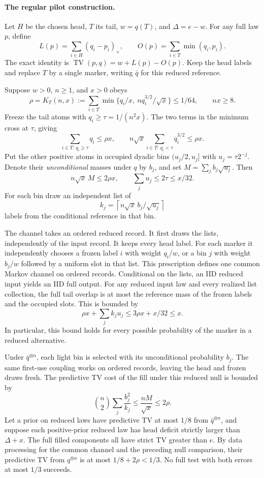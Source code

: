 \paragraph{The regular pilot construction.}
Let \(H\) be the chosen head, \(T\) its tail, \(w=q(T)\), and
\(\Delta=e-w\). For any full law \(p\), define
\[
 L(p)=\sum_{i\in H}(q_i-p_i)_+,\qquad
 O(p)=\sum_{i\in T}\min(q_i,p_i).
\]
The exact identity is \(\operatorname{TV}(p,q)=w+L(p)-O(p)\).
Keep the head labels and replace \(T\) by a single marker, writing
\(\bar q\) for this reduced reference.

Suppose \(w>0\), \(n\geq1\), and \(x>0\) obeys
\[
 \rho=K_T(n,x)
  :=\sum_{i\in T}\min\{q_i/x,\ n q_i^{3/2}/\sqrt{x}\}
  \leq 1/64,\qquad nx\geq 8.
\]
Freeze the tail atoms with \(q_i\geq \tau=1/(n^2x)\).
The two terms in the minimum cross at \(\tau\), giving
\[
 \sum_{i\in T:\,q_i\geq\tau}q_i\leq \rho x,\qquad
 n\sqrt{x}\sum_{i\in T:\,q_i<\tau}q_i^{3/2}\leq \rho x.
\]
Put the other positive atoms in occupied dyadic bins
\((u_j/2,u_j]\) with \(u_j=\tau 2^{-j}\). Denote their
\emph{unconditional} masses under \(q\) by \(b_j\), and set
\(M=\sum_j b_j\sqrt{u_j}\). Then
\[
 n\sqrt{x}\,M\leq 2\rho x,\qquad
 \sum_j u_j\leq 2\tau\leq x/32.
\]
For each bin draw an independent list of
\[
 k_j=\left\lceil n\sqrt{x}\,b_j/\sqrt{u_j}\right\rceil
\]
labels from the conditional reference in that bin.

The channel takes an ordered reduced record. It first draws the lists,
independently of the input record. It keeps every head label. For
each marker it independently chooses a frozen label \(i\) with
weight \(q_i/w\), or a bin \(j\) with weight \(b_j/w\) followed by
a uniform slot in that list. This prescription defines one common
Markov channel on ordered records. Conditional on the lists, an
IID reduced input yields an IID full output. For any reduced input
law and every realized list collection, the full tail overlap is
at most the reference mass of the frozen labels and the occupied
slots. This is bounded by
\[
 \rho x+\sum_j k_j u_j
 \leq 3\rho x+x/32\leq x.
\]
In particular, this bound holds for every possible probability of
the marker in a reduced alternative.

Under \(\bar q^{\otimes n}\), each light bin is selected with its
unconditional probability \(b_j\). The same first-use coupling
works on ordered records, leaving the head and frozen draws
fresh. The predictive TV cost of the fill under this reduced
null is bounded by
\[
 \binom n2\sum_j\frac{b_j^2}{k_j}
  \leq \frac{nM}{\sqrt{x}}\leq 2\rho .
\]
Let a prior on reduced laws have predictive TV at most \(1/8\)
from \(\bar q^{\otimes n}\), and suppose each positive-prior reduced
law has head deficit strictly larger than \(\Delta+x\). The
full filled components all have strict TV greater than \(e\).
By data processing for the common channel and the preceding
null comparison, their predictive TV from \(q^{\otimes n}\) is
at most \(1/8+2\rho<1/3\). No full test with both errors at most
\(1/3\) succeeds.

